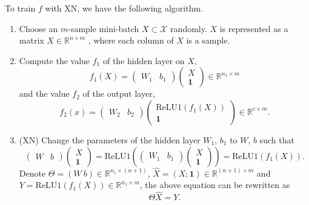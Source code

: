 To train $f$ with XN, we have the following algorithm.
\begin{enumerate}
	\item Choose an $m$-sample mini-batch $X\subset\mathcal{X}$ randomly. $X$ is represented as a matrix $X\in\mathbb{R}^{n\times m}$ , where each column of $X$ is a sample.
	\item Compute the value $f_1$ of the hidden layer on $X$,
	\begin{equation}
		f_1(X)=
		\begin{pmatrix}
			W_1 & b_1
		\end{pmatrix}
		\begin{pmatrix}
			X \\ \mathbf{1}
		\end{pmatrix}
		\in\mathbb{R}^{n_1\times m}
	\end{equation}
	and the value $f_2$ of the output layer,
	\begin{equation}
		f_2(x)=
		\begin{pmatrix}
		W_2 & b_2
		\end{pmatrix}
		\begin{pmatrix}
		\text{ReLU1}(f_1(X)) \\ \mathbf{1}
		\end{pmatrix}
		\in\mathbb{R}^{c\times m}.
	\end{equation}
	\item (XN) Change the parameters of the hidden layer $W_1$, $b_1$ to $W$, $b$ such that
	\begin{equation}
		\begin{pmatrix}
			W & b
		\end{pmatrix}
		\begin{pmatrix}
			X \\ \mathbf{1}
		\end{pmatrix}
		=
		\text{ReLU1}\left(
		\begin{pmatrix}
			W_1 & b_1
		\end{pmatrix}
		\begin{pmatrix}
			X \\ \mathbf{1}
		\end{pmatrix}\right)
		=\text{ReLU1}(f_1(X)).
	\end{equation}
	Denote $\Theta=(W\ b)\in\mathbb{R}^{n_1\times(n+1)}$, $\hat X=(X;\mathbf{1})\in\mathbb{R}^{(n+1)\times m}$ and $Y=\text{ReLU1}(f_1(X))\in\mathbb{R}^{n_1\times m}$, the above equation can be rewritten as 
	\begin{equation}\label{XNeq}
		\Theta \hat X=Y.
	\end{equation} 

\end{enumerate}
